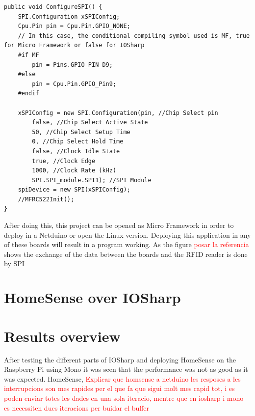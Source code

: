 \begin{lstlisting}[language=CSharp, caption={SPIApi.cs - Conditional compiling symbol for NETMF and IOSharp}]
public void ConfigureSPI() {
    SPI.Configuration xSPIConfig;
    Cpu.Pin pin = Cpu.Pin.GPIO_NONE;
  	// In this case, the conditional compiling symbol used is MF, true for Micro Framework or false for IOSharp
  	#if MF
    	pin = Pins.GPIO_PIN_D9;
    #else
        pin = Cpu.Pin.GPIO_Pin9;
    #endif

    xSPIConfig = new SPI.Configuration(pin, //Chip Select pin
        false, //Chip Select Active State
        50, //Chip Select Setup Time
        0, //Chip Select Hold Time
        false, //Clock Idle State
        true, //Clock Edge
        1000, //Clock Rate (kHz)
        SPI.SPI_module.SPI1); //SPI Module
    spiDevice = new SPI(xSPIConfig);
    //MFRC522Init();
}
\end{lstlisting}

After doing this, this project can be opened as Micro Framework in order to deploy in a Netduino or open the Linux version. Deploying this application in any of these boards will result in a program working. As the figure \textcolor{red}{posar la referencia} shows the exchange of the data between the boards and the RFID reader is done by SPI

\section{HomeSense over IOSharp}\label{S:HomeSense-IOSharp}

\section{Results overview}\label{S:Results-overview}
After testing the different parts of IOSharp and deploying HomeSense on the Raspberry Pi using Mono it was seen that the performance was not as good as it was expected. HomeSense, \textcolor{red}{Explicar que homsense a netduino les resposes a les interrupcions son mes rapides per el que fa que sigui molt mes rapid tot, i es poden enviar totes les dades en una sola iteracio, mentre que en iosharp i mono es necessiten dues iteracions per buidar el buffer}